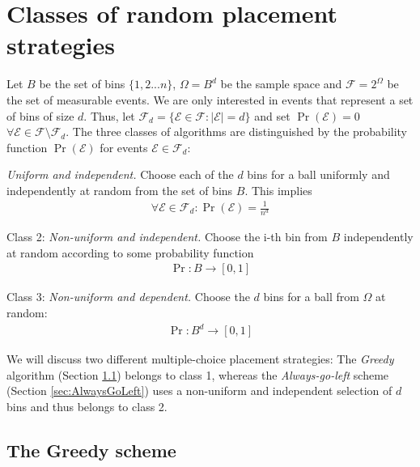 \documentclass[a4paper,12pt]{article}
\begin{document}
\section{Classes of random placement strategies}
\label{sec:classesOfPlacement}
Let $B$ be the set of bins $\{1,2...n\}$, $\Omega = B^{d}$ be the sample space and $\mathcal{F} = 2^{\Omega}$ be the set of measurable events. We are only interested in events that represent a set of bins of size $d$. Thus, let $\mathcal{F}_d = \{\mathcal{E} \in \mathcal{F}: \left\vert \mathcal{E} \right\vert = d\}$ and set $\Pr\left(\mathcal{E}  \right) = 0$  $\forall \mathcal{E} \in \mathcal{F} \setminus \mathcal{F}_d $. The three classes of algorithms are distinguished by the probability function $\Pr\left(\mathcal{E}\right)$ for events $\mathcal{E} \in \mathcal{F}_d$:
\begin{compactitem}
\item  \emph{Uniform and independent.} Choose each of the $d$ bins for a ball uniformly and independently at random from the set of bins $B$. This implies 
\begin{align*}
\forall \mathcal{E} \in \mathcal{F}_d: \Pr\left(\mathcal{E}\right) = \frac{1}{n ^{d}}
\end{align*}
\item Class 2: \emph{Non-uniform and independent.} Choose the i-th bin from $B$ independently at random according to some probability function
\begin{align*}
\Pr: B \rightarrow \left[0,1\right]
\end{align*}

\item Class 3: \emph{Non-uniform and dependent.} Choose the $d$ bins for a ball from $\Omega$ at random:
\begin{align*}
\Pr: B^{d} \rightarrow \left[0,1\right]
\end{align*}
\end{compactitem} 
 
We will discuss two different multiple-choice placement strategies: The \emph{Greedy} algorithm (Section \ref{sec:greedy}) belongs to class 1, whereas the \emph{Always-go-left} scheme (Section \ref{sec:AlwaysGoLeft}) uses a non-uniform and independent selection of $d$ bins and thus belongs to class 2.

\subsection{The Greedy scheme}
\label{sec:greedy}
\end{document}
